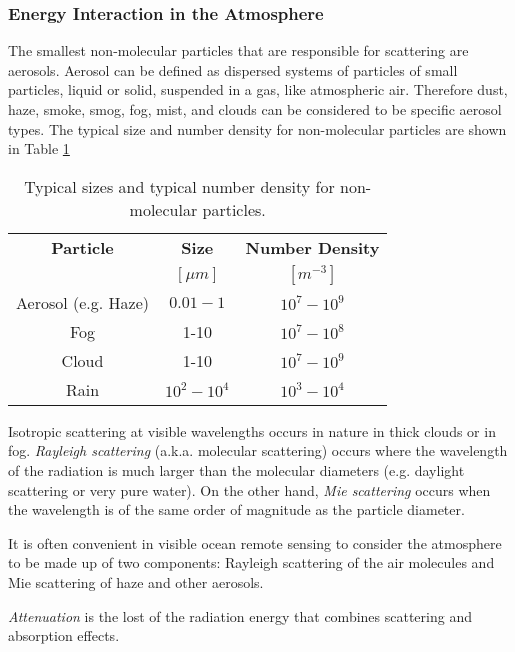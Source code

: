 \subsubsection*{Energy Interaction in the Atmosphere }

The smallest non-molecular particles that are responsible for scattering are aerosols. Aerosol can be defined as dispersed systems of particles of small particles, liquid or solid, suspended in a gas, like atmospheric air. Therefore dust, haze, smoke, smog, fog, mist, and clouds can be considered to be specific aerosol types. The typical size and number density for non-molecular particles are shown in Table \ref{tab:aerosol_size}

\begin{table}[htb]
\caption{ Typical sizes and typical number density for non-molecular particles. \label{tab:aerosol_size} } 
\centering
\begin{tabular}{c|c|c}
          \bfseries{Particle}   & \bfseries{Size}  & \bfseries{Number Density} \\ 
  & $[\mu m]$     & $[m^{-3}]$      \\ \hline \hline
    Aerosol (e.g. Haze) & $0.01-1$  &   $10^7-10^9$   \\
    Fog     & 1-10    & $10^7-10^8$   \\
    Cloud     & 1-10    & $10^7-10^9$   \\
    Rain    & $10^2-10^4$   & $10^3-10^4$   \\   
 \end{tabular}
\end{table}



Isotropic scattering at visible wavelengths occurs in nature in thick clouds or in fog. {\it Rayleigh scattering}   (a.k.a. molecular scattering) occurs where the wavelength of the radiation is much larger than the molecular diameters (e.g. daylight scattering or very pure water). On the other hand, {\it Mie scattering} occurs when the wavelength is of the same order of magnitude as the particle diameter. 

It is often convenient in visible ocean remote sensing to consider the atmosphere to be made up of two components: Rayleigh scattering of the air molecules and Mie scattering of haze and other aerosols. 

{\it Attenuation} is the lost of the radiation energy that combines scattering and absorption effects.

